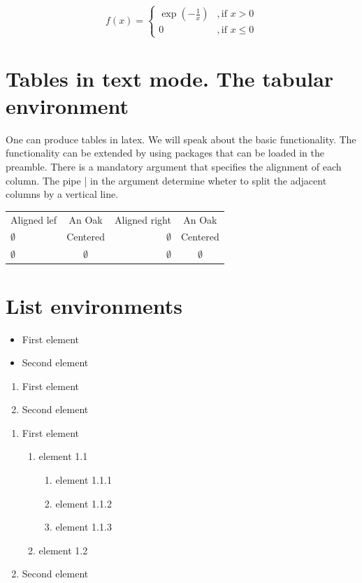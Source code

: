 \documentclass[a4paper]{article}
\begin{document}
  $$
  f(x ) = %
    \begin{cases}
      \exp\left(-\frac{1}{x}\right) &, \text{if } x > 0 \\
      0 &, \text{if } x\leq 0
    \end{cases}
  $$


\section{Tables in text mode. The tabular environment}

One can produce tables in latex. We will speak about the basic functionality. The functionality can be extended by using packages that can be loaded in the preamble. There is a mandatory argument that specifies the alignment of each column. The pipe | in the argument determine wheter to split the adjacent columns by a vertical line.

\begin{tabular}{l c r | c} %
Aligned lef & An Oak &  Aligned right & An Oak \\
$\emptyset$ & Centered & $\emptyset$ &  Centered \\
\hline %
$\emptyset$ & $\emptyset$ & $\emptyset$ &  $\emptyset$ \\
\end{tabular}


\section{List environments}

\begin{itemize}
  \item First element
  \item Second element
\end{itemize}

\begin{enumerate}
  \item First element
  \item Second element
\end{enumerate}

\begin{enumerate}
  \item First element
    \begin{enumerate}
      \item element 1.1
      \begin{enumerate}
        \item element 1.1.1
        \item element 1.1.2
        \item element 1.1.3
      \end{enumerate}
      \item element 1.2
    \end{enumerate}
  \item Second element
\end{enumerate}
\end{document}
